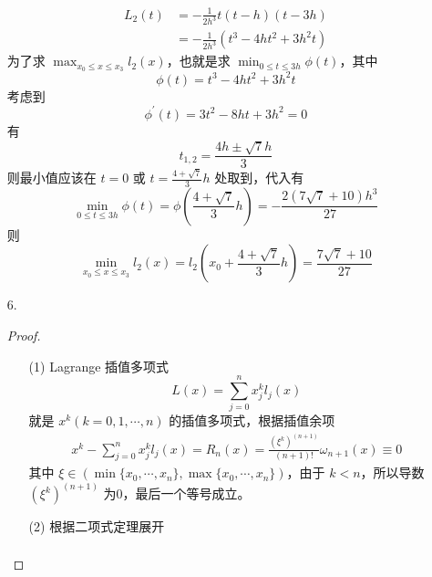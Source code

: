 \documentclass{sjtuarticle}
\begin{document}
\begin{itemize}
\begin{solution}
\begin{align*}
            L_2(t)&=-\frac{1}{2h^3}t(t-h)(t-3h)\\
            &=-\frac{1}{2h^3}(t^3-4ht^2+3h^2t)
        \end{align*}
        为了求 $\max_{x_0\leq x\leq x_3}l_2(x)$，也就是求 $\min_{0\leq t\leq 3h}\phi(t)$，其中
        \begin{equation*}
            \phi(t)=t^3-4ht^2+3h^2t
        \end{equation*}
        考虑到
        \begin{equation*}
            \phi^\prime (t)=3t^2-8ht+3h^2 = 0
        \end{equation*}
        有
        \begin{equation*}
            t_{1,2}=\frac{4h\pm \sqrt{7}h}{3}
        \end{equation*}
        则最小值应该在 $t=0$ 或 $t=\frac{4+\sqrt{7}}{3}h$ 处取到，代入有
        \begin{equation*}
            \min_{0\leq t\leq 3h}\phi(t)=\phi\left(\frac{4+\sqrt{7}}{3}h\right)=-\frac{2(7\sqrt{7} +10)h^3}{27}
        \end{equation*}
        则
        \begin{equation*}
            \min_{x_0\leq x\leq x_3}l_2(x)=l_2\left(x_0+\frac{4+\sqrt{7}}{3}h\right)=\frac{7\sqrt{7} +10}{27}
        \end{equation*}
    \end{solution}
    \item[6.]\begin{proof}
        \begin{itemize}
            \item[(1)] Lagrange 插值多项式
            \begin{equation*}
                L(x)=\sum_{j=0}^n x_j^kl_j(x)
            \end{equation*}
            就是 $x^k (k=0,1,\cdots,n)$ 的插值多项式，根据插值余项
            \begin{align*}
                x^k - \sum_{j=0}^n x_j^kl_j(x) = R_n(x) = \frac{(\xi^k)^{(n+1)}}{(n+1)!}\omega_{n+1}(x)\equiv 0
            \end{align*}
            其中 $\xi\in (\min\{x_0,\cdots,x_n\}, \max\{x_0,\cdots,x_n\})$，由于 $k<n$，所以导数 $(\xi^k)^{(n+1)}$ 为0，最后一个等号成立。
            \item[(2)] 根据二项式定理展开
            \begin{align*}

\end{align*}
\end{itemize}
\end{proof}
\end{itemize}
\end{document}
